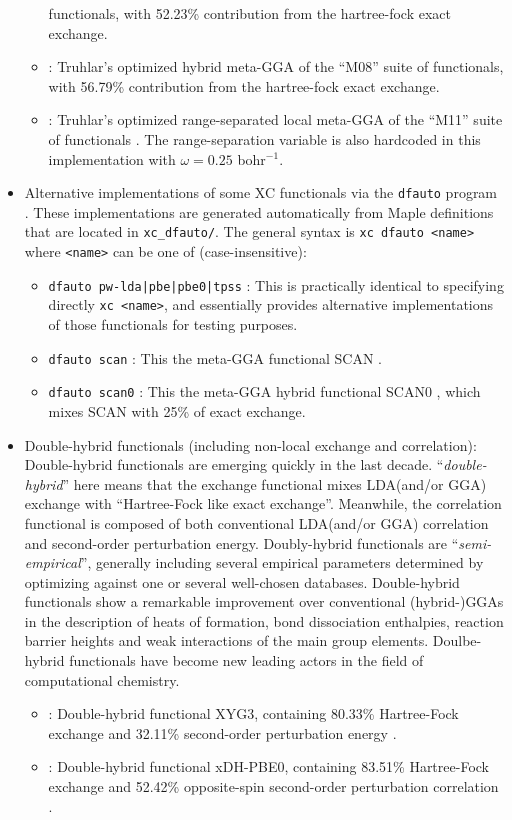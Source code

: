 \begin{itemize}
\begin{itemize}
    functionals, with 52.23\% contribution from the hartree-fock exact exchange. \cite{ZhaoTruhlar08_M08-HX_M08-SO}
  \item {} : Truhlar's optimized hybrid meta-GGA of the ``M08'' suite of
    functionals, with 56.79\% contribution from the hartree-fock exact exchange. \cite{ZhaoTruhlar08_M08-HX_M08-SO}
  \item {} : Truhlar's optimized range-separated local meta-GGA of the ``M11'' suite of
  functionals \cite{PeveratiTruhlar11_M11}. The range-separation variable is also hardcoded in this implementation with
  $\omega = 0.25$ bohr$^{-1}$.
    \end{itemize}
  \item Alternative implementations of some XC functionals via the \verb+dfauto+ program \cite{Strange2001}. These implementations are generated automatically from Maple definitions that are located in \verb+xc_dfauto/+. The general syntax is \verb+xc dfauto <name>+ where \verb+<name>+ can be one of (case-insensitive):
  \begin{itemize}
    \item \verb+dfauto pw-lda|pbe|pbe0|tpss+ : This is practically identical to specifying directly \verb+xc <name>+, and essentially provides alternative implementations of those functionals for testing purposes.
    \item \verb+dfauto scan+ : This the meta-GGA functional SCAN \cite{Sun2015}.
    \item \verb+dfauto scan0+ : This the meta-GGA hybrid functional SCAN0 \cite{Hui2016}, which mixes SCAN with 25\% of exact exchange.
  \end{itemize}
  \item Double-hybrid functionals (including non-local exchange and correlation):
	  Double-hybrid functionals are emerging quickly in the last decade. ``\emph{double-hybrid}'' here
	  means that the exchange functional mixes LDA(and/or GGA) exchange with ``Hartree-Fock like exact exchange''.
	  Meanwhile, the correlation functional is composed of both conventional LDA(and/or GGA) correlation and
	  second-order perturbation energy. Doubly-hybrid functionals are ``\emph{semi-empirical}'', generally
	  including several empirical parameters determined by optimizing against one or several well-chosen databases.
	  Double-hybrid functionals show a remarkable improvement over conventional (hybrid-)GGAs in the description
	  of heats of formation, bond dissociation enthalpies, reaction barrier heights and weak interactions of the 
	  main group elements.
	  Doulbe-hybrid functionals have become new leading actors in the field of computational chemistry.
     \begin{itemize}
		 \item {} : Double-hybrid functional XYG3, containing 80.33\% Hartree-Fock exchange
			 and 32.11\% second-order perturbation energy \cite{Zhang2009}.
		 \item {} : Double-hybrid functional xDH-PBE0, containing 83.51\% Hartree-Fock exchange
			 and 52.42\% opposite-spin second-order perturbation correlation \cite{Zhang2012}.
     \end{itemize}
	  

\end{itemize}
